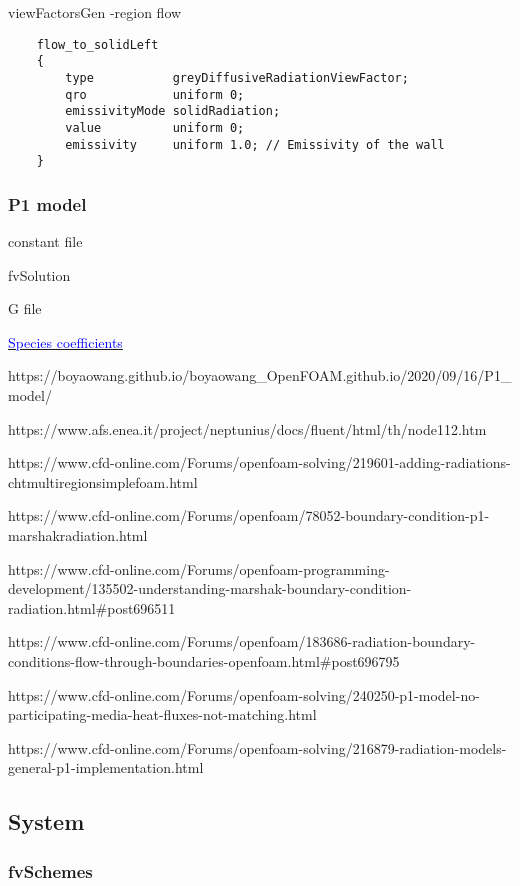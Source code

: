 \documentclass[a4paper, 12pt]{article}
\numberwithin{equation}{section}
\newcommand{\code}{\fontfamily{pcr}\selectfont}
\newcommand{\blue}[1]{\textcolor{blue}{#1}}
\begin{document}
   		{\code viewFactorsGen -region flow}


    {
	\begin{verbatim}
    flow_to_solidLeft
    {
        type           greyDiffusiveRadiationViewFactor;
        qro            uniform 0;
        emissivityMode solidRadiation;
        value          uniform 0;
        emissivity     uniform 1.0; // Emissivity of the wall
    }
	\end{verbatim}
	}

    \subsubsection{P1 model}

	        {\code constant file}

	        {\code fvSolution}

	        {\code G file}

	        \href{https://github.com/Cantera/cantera/pull/965/files}{\blue{Species coefficients}}

	        https://boyaowang.github.io/boyaowang\_OpenFOAM.github.io/2020/09/16/P1\_model/

	        https://www.afs.enea.it/project/neptunius/docs/fluent/html/th/node112.htm

	        https://www.cfd-online.com/Forums/openfoam-solving/219601-adding-radiations-chtmultiregionsimplefoam.html

	        https://www.cfd-online.com/Forums/openfoam/78052-boundary-condition-p1-marshakradiation.html

	        https://www.cfd-online.com/Forums/openfoam-programming-development/135502-understanding-marshak-boundary-condition-radiation.html\#post696511

	        https://www.cfd-online.com/Forums/openfoam/183686-radiation-boundary-conditions-flow-through-boundaries-openfoam.html\#post696795

	        https://www.cfd-online.com/Forums/openfoam-solving/240250-p1-model-no-participating-media-heat-fluxes-not-matching.html

	        https://www.cfd-online.com/Forums/openfoam-solving/216879-radiation-models-general-p1-implementation.html

    \subsection{System}

    \subsubsection{fvSchemes}
\end{document}
